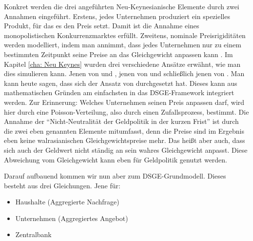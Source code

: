 Konkret werden die drei angeführten Neu-Keynesianische Elemente durch zwei Annahmen eingeführt. Erstens, jedes Unternehmen produziert ein spezielles Produkt, für das es den Preis setzt. Damit ist die Annahme eines monopolistischen Konkurrenzmarktes erfüllt. Zweitens, nominale Preisrigiditäten werden modelliert, indem man annimmt, dass jedes Unternehmen nur zu einem bestimmten Zeitpunkt seine Preise an das Gleichgewicht anpassen kann \parencite[S. 52]{Gali2015}. Im Kapitel \ref{cha: Neu Keynes} wurden drei verschiedene Ansätze erwähnt, wie man dies simulieren kann. Jenen von \textcite{Fischer1977} und \textcite{Taylor1977}, jenen von \textcite{Taylor1979} und schließlich jenen von \textcite{Calvo1983}. Man kann heute sagen, dass sich der Ansatz von \textcite{Calvo1983} durchgesetzt hat. Dieses kann aus mathematischen Gründen am einfachsten in das DSGE-Framework integriert werden. Zur Erinnerung: Welches Unternehmen seinen Preis anpassen darf, wird hier durch eine Poisson-Verteilung, also durch einen Zufallsprozess, bestimmt. Die Annahme der "`Nicht-Neutralität der Geldpolitik in der kurzen Frist"' ist durch die zwei eben genannten Elemente mitumfasst, denn die Preise sind im Ergebnis eben keine walrasianischen Gleichgewichtspreise mehr. Das heißt aber auch, dass sich auch der Geldwert nicht ständig an sein wahres Gleichgewicht anpasst. Diese Abweichung vom Gleichgewicht kann eben für Geldpolitik genutzt werden.

Darauf aufbauend kommen wir nun aber zum DSGE-Grundmodell. Dieses besteht aus drei Gleichungen. Jene für:
\begin{itemize}
	\item Haushalte (Aggregierte Nachfrage)
	\item Unternehmen (Aggregiertes Angebot)
	\item Zentralbank
\end{itemize}

